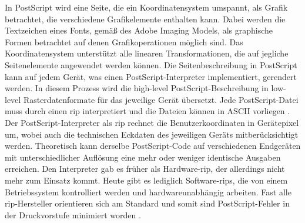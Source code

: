 In PostScript wird eine Seite, die ein Koordinatensystem umspannt, als Grafik betrachtet, die verschiedene Grafikelemente enthalten kann. Dabei werden die Textzeichen eines Fonts, gemäß des Adobe Imaging Models, als graphische Formen betrachtet auf denen Grafikoperationen möglich sind. Das Koordinatensystem unterstützt alle linearen Transformationen, die auf jegliche Seitenelemente angewendet werden können. Die Seitenbeschreibung in PostScript kann auf jedem Gerät, was einen PostScript-Interpreter implementiert, gerendert werden. In diesem Prozess wird die high-level PostScript-Beschreibung in low-level Rasterdatenformate für das jeweilige Gerät übersetzt. Jede PostScript-Datei muss durch einen \gls{rip} interpretiert und die Dateien können in ASCII vorliegen \cite{adobe-postscript}. Der PostScript-Interpreter als \gls{rip} rechnet die Benutzerkoordinaten in Gerätepixel um, wobei auch die technischen Eckdaten des jeweiligen Geräts mitberücksichtigt werden. Theoretisch kann derselbe PostScript-Code auf verschiedenen Endgeräten mit unterschiedlicher Auflösung eine mehr oder weniger identische Ausgaben erreichen. Den Interpreter gab es früher als Hardware-\gls{rip}, der allerdings nicht mehr zum Einsatz kommt. Heute gibt es lediglich Software-\gls{rip}s, die von einem Betriebssystem kontrolliert werden und hardwareunabhängig arbeiten. Fast alle \gls{rip}-Hersteller orientieren sich am Standard und somit sind PostScript-Fehler in der Druckvorstufe minimiert worden \cite{schneeberger}.

